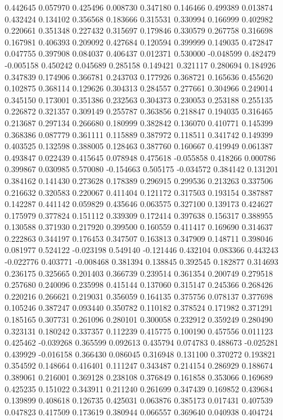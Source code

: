 0.442645
0.057970
0.425496
0.008730
0.347180
0.146466
0.499389
0.013874
0.432424
0.134102
0.356568
0.183666
0.315531
0.330994
0.166999
0.402982
0.220661
0.351348
0.227432
0.315697
0.179846
0.330579
0.267758
0.316698
0.167981
0.406393
0.209092
0.427684
0.120594
0.399999
0.149035
0.472847
0.047755
0.397908
0.084037
0.406437
0.012371
0.530000
-0.048599
0.482479
-0.005158
0.450242
0.045689
0.285158
0.149421
0.321117
0.280694
0.184926
0.347839
0.174906
0.366781
0.243703
0.177926
0.368721
0.165636
0.455620
0.102875
0.368114
0.129626
0.304313
0.284557
0.277661
0.304966
0.249014
0.345150
0.173001
0.351386
0.232563
0.304373
0.230053
0.253188
0.255135
0.226872
0.321357
0.309149
0.255787
0.363856
0.218847
0.194035
0.316465
0.213687
0.297134
0.266680
0.180999
0.382842
0.136070
0.410771
0.145399
0.368386
0.087779
0.361111
0.115889
0.387972
0.118511
0.341742
0.149399
0.403525
0.132598
0.388005
0.128463
0.387760
0.160667
0.419949
0.061387
0.493847
0.022439
0.415645
0.078948
0.475618
-0.055858
0.418266
0.000786
0.399867
0.030985
0.570080
-0.154663
0.505175
-0.034572
0.384142
0.131201
0.384162
0.141430
0.273628
0.178389
0.296915
0.299536
0.213263
0.337506
0.216632
0.320583
0.220067
0.411404
0.121172
0.317503
0.193154
0.387887
0.142287
0.441142
0.059829
0.435646
0.063575
0.327100
0.139173
0.424627
0.175979
0.377824
0.151112
0.339309
0.172414
0.397638
0.156317
0.388955
0.130588
0.371930
0.217920
0.399500
0.160559
0.411417
0.169690
0.314637
0.222863
0.344197
0.176453
0.347507
0.163813
0.347909
0.148711
0.398046
0.081977
0.524122
-0.023198
0.549140
-0.121446
0.432104
0.083366
0.443243
-0.022776
0.403771
-0.008468
0.381394
0.138845
0.392545
0.182877
0.314693
0.236175
0.325665
0.201403
0.366739
0.239514
0.361354
0.200749
0.279518
0.257680
0.240096
0.235998
0.415144
0.137060
0.315147
0.245366
0.268426
0.220216
0.266621
0.219031
0.356059
0.164135
0.375756
0.078137
0.377698
0.105246
0.387247
0.093440
0.350782
0.110182
0.378524
0.171982
0.371291
0.185165
0.307731
0.261096
0.280101
0.300058
0.232912
0.359249
0.280490
0.323131
0.180242
0.337357
0.112239
0.415775
0.100190
0.457556
0.011123
0.425462
-0.039268
0.365599
0.092613
0.435794
0.074783
0.488673
-0.025281
0.439929
-0.016158
0.366430
0.086045
0.316948
0.131100
0.370272
0.193821
0.354592
0.148664
0.416401
0.111247
0.343487
0.214154
0.286929
0.188674
0.389061
0.216001
0.369128
0.238108
0.376849
0.161858
0.353066
0.169689
0.425235
0.151022
0.343911
0.211240
0.261699
0.347439
0.169852
0.439684
0.139899
0.408618
0.126735
0.425031
0.063876
0.385173
0.017431
0.407539
0.047823
0.417509
0.173619
0.380944
0.066557
0.369640
0.040938
0.404724
